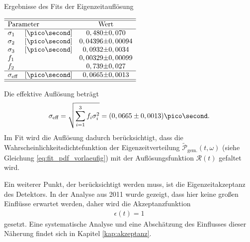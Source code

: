\begin{table}[hptb]
\centering
\caption{Ergebnisse des Fits der Eigenzeitauflösung}
\label{tab:resolution}
$\begin{array}{ll r@{\pm}l}
\hline 
\hline
\multicolumn{2}{l}{\text{Parameter}} & \multicolumn{2}{c}{\text{Wert}}\\
\hline
\sigma_{1}& [\ps] & 0,480 & 0,070 \\
\sigma_{2}& [\ps] & 0,04396 & 0,00094 \\
\sigma_{3}& [\ps] & 0,0932 & 0,0034 \\
f_{1} & & 0,00329 & 0,00099\\
f_{2} & & 0,739 & 0,027\\ \hline
\sigma_{\text{eff}}& [\ps] & 0,0665 & 0,0013 \\ \hline \hline
\end{array}$   
\end{table}
Die effektive Auflösung beträgt
\begin{align}
\sigma_{\text{eff}} = \sqrt{\sum_{i=1}^3 f_i \sigma_i^2} = (0,0665\pm 0,0013)\ps.
\end{align}
Im Fit wird die Auflösung dadurch berücksichtigt, dass die Wahrscheinlichkeitsdichtefunktion der Eigenzeitverteilung $\widetilde{\mathcal{P}}_{\text{gem.}}(t, \omega)$ (siehe Gleichung \ref{eq:fit_pdf_vorlaeufig}) mit der Auflösungsfunktion $\mathcal{R}(t)$ gefaltet wird. 

Ein weiterer Punkt, der berücksichtigt werden muss, ist die Eigenzeitakzeptanz des Detektors. In der Analyse aus 2011 \cite{lhcb-paper} wurde gezeigt, dass hier keine großen Einflüsse erwartet werden, daher wird die Akzeptanzfunktion 
\begin{align}
\epsilon(t) = 1
\end{align}
gesetzt. Eine systematische Analyse und eine Abschätzung des Einflusses dieser Näherung findet sich in Kapitel \ref{kap:akzeptanz}.

